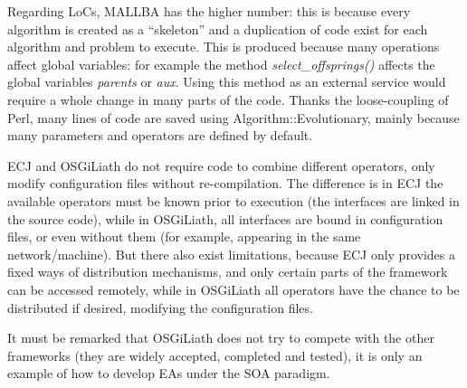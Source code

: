 Regarding LoCs, MALLBA has the higher number: this is because every algorithm is created as a ``skeleton'' and a duplication of code exist for each algorithm and problem to execute. This is produced because many operations affect global variables: for example the method {\em select\_offsprings()} affects the global variables {\em parents} or {\em aux}. Using this method as an external service would require a whole change in many parts of the code. Thanks the loose-coupling of Perl, many lines of code are saved using Algorithm::Evolutionary, mainly because many parameters and operators are defined by default.



ECJ and OSGiLiath do not require code to combine different operators, only modify configuration files without re-compilation. The difference is in ECJ the available operators must be known prior to execution (the interfaces are linked in the source code), while in OSGiLiath, all interfaces are bound in configuration files, or even without them (for example, appearing in the same network/machine). But there also exist limitations, because ECJ only provides a fixed ways of distribution mechanisms, and only certain parts of the framework can be accessed remotely, while in OSGiLiath all operators have the chance to be distributed if desired, modifying the configuration files.


It must be remarked that OSGiLiath does not try to compete with the other frameworks (they are widely accepted, completed and tested), it is only an example of how to develop EAs under the SOA paradigm.
